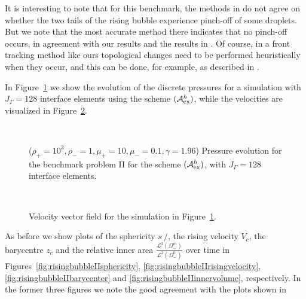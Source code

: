 \documentclass[a4paper,12pt,onecolumn]{article}
\newcommand{\strikes}{\mbox{$s\!\!\!\!\:/$}}
\newcommand{\schemeAex}{{\mathcal{A}^h_{\rm ex}}}
\begin{document}
It is interesting to note that for this benchmark, the methods in 
\cite{HysingTKPBGT09} do not agree on whether the two tails of the rising
bubble experience pinch-off of some droplets. But we note that the most
accurate method there indicates that no pinch-off occurs, in agreement with our
results and the results in \cite{AlandV12,fluidfbp}. Of course, in a front
tracking method like ours topological changes need to be performed
heuristically when they occur, and this can be done, for example, as described
in \cite{BrochuB09,Sacconi15}.

In Figure~\ref{fig:risingbubbleIIpressure} we show the evolution of the discrete
pressures for a simulation with $J_\Gamma=128$ interface elements using the
scheme $(\schemeAex)$, while the velocities are visualized in
Figure~\ref{fig:risingbubbleIIvelocity}.
\begin{figure}[htbp]
\centering
{}
\\
\caption{($\rho_+ = 10^3,\rho_- = 1,\mu_+ = 10,\mu_- =0.1,\gamma = 1.96$)
Pressure evolution for the benchmark problem II for the scheme $(\schemeAex)$,
with $J_\Gamma=128$ interface elements.}
\label{fig:risingbubbleIIpressure}
\end{figure}%
\begin{figure}[htbp]
\centering
{}
\\
\caption{Velocity vector field for the simulation in
Figure~\ref{fig:risingbubbleIIpressure}.}
\label{fig:risingbubbleIIvelocity}
\end{figure}%
As before we show plots of the sphericity $\strikes$, the
rising velocity $V_c$, the barycentre $z_c$ and the relative
inner area $\frac{\mathcal{L}^2(\Omega^m_-)}{\mathcal{L}^2(\Omega^0_-)}$ over
time in Figures~\ref{fig:risingbubbleIIsphericity},
\ref{fig:risingbubbleIIrisingvelocity}, \ref{fig:risingbubbleIIbarycenter} and
\ref{fig:risingbubbleIIinnervolume}, respectively. In the former three
figures we note the good agreement with the plots shown in
\end{document}
